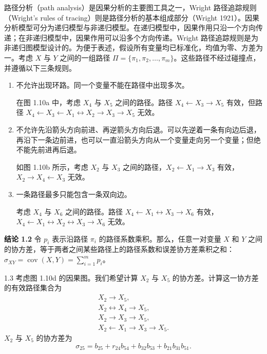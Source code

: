 路径分析（path analysis）是因果分析的主要图工具之一，Wright 路径追踪规则（Wright's rules of tracing）则是路径分析的基本组成部分（Wright 1921）。因果分析模型可分为递归模型与非递归模型。在递归模型中，因果作用只沿一个方向传递；在非递归模型中，因果作用可以沿多个方向传递。Wright 路径追踪规则是为非递归图模型设计的。为便于表述，假设所有变量均已标准化，均值为零、方差为一。考虑 $X$ 与 $Y$ 之间的一组路径 $\Pi=\{\pi_1,\pi_2,\ldots,\pi_m\}$。这些路径不经过碰撞点，并遵循以下三条规则。

\begin{enumerate}
\item 不允许出现环路。同一个变量不能在路径中出现多次。

在图 1.10a 中，考虑 $X_4$ 与 $X_5$ 之间的路径。路径 $X_4\leftarrow X_3\to X_5$ 有效，但路径 $X_4\leftarrow X_3\leftarrow X_1\leftrightarrow X_2\to X_3\to X_5$ 无效。
\item 不允许先沿箭头方向前进、再逆箭头方向后退。可以先逆着一条有向边后退，再沿下一条边前进，也可以一直沿箭头方向从一个变量走向另一个变量；但绝不能先前进再后退。

如图 1.10b 所示，考虑 $X_2$ 与 $X_3$ 之间的路径，$X_2\leftarrow X_1\to X_3$ 有效，$X_2\to X_4\leftarrow X_3$ 无效。
\item 一条路径最多只能包含一条双向边。

考虑 $X_4$ 与 $X_6$ 之间的路径。路径 $X_4\leftarrow X_1\leftrightarrow X_3\to X_6$ 有效，$X_4\leftarrow X_1\leftrightarrow X_2\leftrightarrow X_3\to X_6$ 无效。
\end{enumerate}



\medskip\noindent\textbf{结论 1.2}\quad
令 $p_i$ 表示沿路径 $\pi_i$ 的路径系数乘积。那么，任意一对变量 $X$ 和 $Y$ 之间的协方差，等于两者之间某些路径上的路径系数和误差协方差乘积之和：
$\sigma_{XY}=\operatorname{cov}(X,Y)=\sum_{i=1}^mp_i$。
\par\medskip

\begin{bookexample}{1.3}
考虑图 1.10d 的因果图。我们希望计算 $X_2$ 与 $X_5$ 的协方差。计算这一协方差的有效路径集合为
\[
\begin{gathered}
X_2\to X_5,\\
X_2\leftrightarrow X_4\to X_5,\\
X_2\to X_3\to X_5,\\
X_2\leftarrow X_1\to X_3\to X_5.
\end{gathered}
\]
$X_2$ 与 $X_5$ 的协方差为
\[
\sigma_{25}=b_{25}+r_{24}b_{54}+b_{32}b_{53}+b_{21}b_{31}b_{51}.
\]
\end{bookexample}


